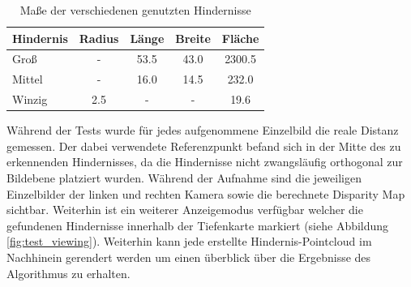 	\begin{table}[h]
	\centering
	\begin{tabular}{|l|c|c|c|c|}
	\hline
	Hindernis   & Radius & Länge & Breite & Fläche \\
	\hline
	Groß   		&   -    & 53.5  & 43.0   & 2300.5 \\
	\hline
	Mittel 		& 	-    & 16.0  & 14.5   & 232.0\\
	\hline
	Winzig		& 2.5	 &   -   &   -    & 19.6 \\
	\hline	
	\end{tabular}
	\label{tbl:obstacle_sizes}
	\caption{Maße der verschiedenen genutzten Hindernisse}
	\end{table}
	
	\noindent
	Während der Tests wurde für jedes aufgenommene Einzelbild die reale Distanz gemessen. Der dabei verwendete Referenzpunkt befand sich in der Mitte des zu erkennenden Hindernisses, da die Hindernisse nicht zwangsläufig orthogonal zur Bildebene platziert wurden. Während der Aufnahme sind die jeweiligen Einzelbilder der linken und rechten Kamera sowie die berechnete Disparity Map sichtbar. Weiterhin ist ein weiterer Anzeigemodus verfügbar welcher die gefundenen Hindernisse innerhalb der Tiefenkarte markiert (siehe Abbildung \ref{fig:test_viewing}). Weiterhin kann jede erstellte Hindernis-Pointcloud im Nachhinein gerendert werden um einen überblick über die Ergebnisse des Algorithmus zu erhalten.
	
